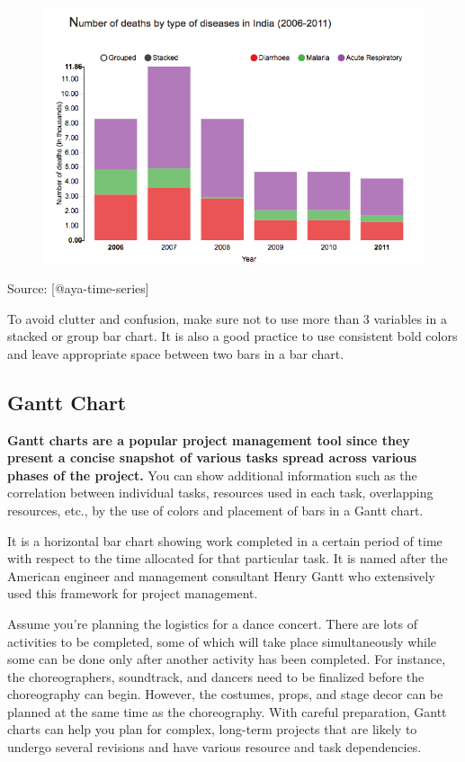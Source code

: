 \documentclass[]{book}
\theoremstyle{definition}
\theoremstyle{definition}
\theoremstyle{definition}
\theoremstyle{remark}
\begin{document}
\begin{figure}
\centering
\includegraphics{images/aya-bar2.png}
\caption{}
\end{figure}

Source: {[}@aya-time-series{]}

To avoid clutter and confusion, make sure not to use more than 3
variables in a stacked or group bar chart. It is also a good practice to
use consistent bold colors and leave appropriate space between two bars
in a bar chart.

\subsection{Gantt Chart}\label{gantt-chart}

\textbf{Gantt charts are a popular project management tool since they
present a concise snapshot of various tasks spread across various phases
of the project.} You can show additional information such as the
correlation between individual tasks, resources used in each task,
overlapping resources, etc., by the use of colors and placement of bars
in a Gantt chart.

It is a horizontal bar chart showing work completed in a certain period
of time with respect to the time allocated for that particular task. It
is named after the American engineer and management consultant Henry
Gantt who extensively used this framework for project management.

Assume you're planning the logistics for a dance concert. There are lots
of activities to be completed, some of which will take place
simultaneously while some can be done only after another activity has
been completed. For instance, the choreographers, soundtrack, and
dancers need to be finalized before the choreography can begin. However,
the costumes, props, and stage decor can be planned at the same time as
the choreography. With careful preparation, Gantt charts can help you
plan for complex, long-term projects that are likely to undergo several
revisions and have various resource and task dependencies.
\end{document}
